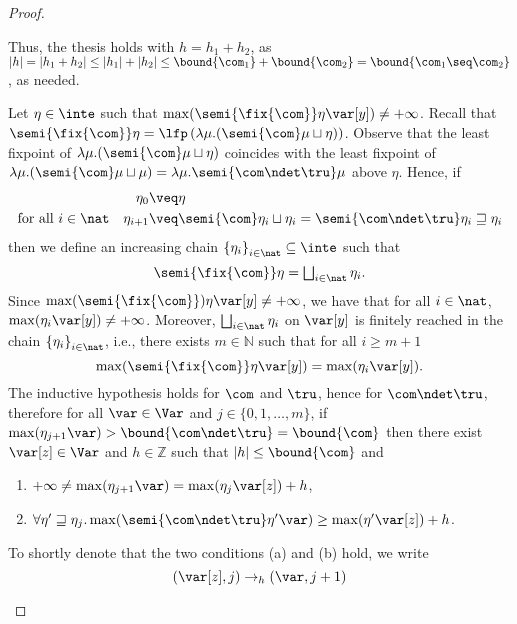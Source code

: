 \begin{proof}
\begin{inductive}
    Thus, the thesis holds with \(h= h_1+h_2\), as
    \(|h| =|h_1 +h_2| \leq |h_1| + |h_2| \leq \bound{\com_1} +
    \bound{\com_2} = \bound{\com_1 \seq \com_2}\), as needed.

    
    \case{\(\fix{\com}\)}
    Let \(\eta \in \inte\) such that
    \(\max(\semi{\fix{\com}} \eta \var[y]) \neq + \infty\). Recall that
    \(\semi{\fix{\com}} \eta = \lfp\left({\lambda \mu. (\semi{\com} \mu
        \sqcup\eta)}\right)\). Observe that the least fixpoint of
    \(\lambda \mu. (\semi{\com} \mu \sqcup\eta)\) coincides with the
    least fixpoint of
    \(\lambda \mu. (\semi{\com} \mu \sqcup \mu) = \lambda \mu. \semi{
      \com\ndet \tru} \mu\) above \(\eta\). Hence, if
    \begin{align*}
    \eta_0 & \veq \eta \\
    \text{for all } i\in \nat \quad \eta_{i+1} & \veq \semi{\com} \eta_i \sqcup \eta_i= \semi{\com \ndet \tru} \eta_i \sqsupseteq \eta_i
    \end{align*}
    then we define an increasing chain
    \({\{\eta_i\}}_{i\in \nat}\subseteq \inte\) such that
    \[ 
      \semi{\fix{\com}} \eta = \textstyle\bigsqcup_{i \in \nat} \eta_i.
    \]
    Since \(\max(\semi{\fix{\com}}) \eta \var[y] \neq +\infty\), we have
    that for all \(i\in \nat\), \(\max(\eta_i \var[y]) \neq
    +\infty\). Moreover, \(\textstyle\bigsqcup_{i \in \nat} \eta_i\) on
    \(\var[y]\) is finitely reached in the chain
    \({\{\eta_i\}}_{i\in \nat}\), i.e., there exists
    \(m \in \mathbb{N}\) such that for all \(i \geq m+1\)
    \[
      \max(\semi{\fix{\com}} \eta \var[y]) = \max(\eta_{i} \var[y]).
    \]
    The inductive hypothesis holds for \(\com\) and \(\tru\), hence for
    \(\com \ndet \tru\), therefore for all \(\var \in \Var\) and
    \(j \in \{0,1, \ldots, m\}\), if \(\max(\eta_{j+1} \var) >\bound{\com\ndet \tru} =\bound{\com}\) then
    there exist \(\var[z] \in \Var\) and \(h \in \mathbb{Z}\) such that \(|h| \leq \bound{\com}\) and 
    \begin{enumerate}[label=(\alph*)]
    \item\label{pointa} \(+\infty \neq \max(\eta_{j+1} \var) = \max(\eta_j \var[z]) + h\),
    \item\label{pointb} \(\forall \eta' \sqsupseteq \eta_j.
      \max(\semi{\com \ndet \tru}\eta'\var) \geq \max(\eta' \var[z]) + h\).
    \end{enumerate}
    To shortly denote that the two conditions (a) and (b) hold, we write
    \[
      (\var[z],j) \to_{h} (\var, j+1)
    \]
    

\end{inductive}
\end{proof}
